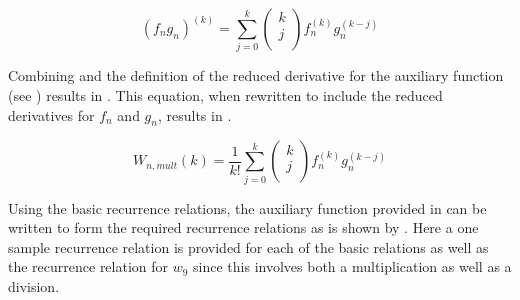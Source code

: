 \begin{equation} \label{eq:Leibniz}
\left(f_{n}g_{n}\right)^{\left( k\right)}=\displaystyle\sum_{j=0}^{k}
\left(
\begin{matrix}
k\\
j\\
\end{matrix}
\right)
f_{n}^{\left( k\right)}g_{n}^{\left( k-j\right)}
\end{equation}

Combining  and the definition of the reduced derivative for the auxiliary function (see ) results in . This equation, when rewritten to include the reduced derivatives for $f_{n}$ and $g_{n}$, results in .

\begin{equation} \label{eq:LeibnizInt}
W_{n,mult}\left(k\right)=\dfrac{1}{k!}\displaystyle\sum_{j=0}^{k}
\left(
\begin{matrix}
k\\
j\\
\end{matrix}
\right)
f_{n}^{\left( k\right)}g_{n}^{\left( k-j\right)}
\end{equation}

Using the basic recurrence relations, the auxiliary function provided in  can be written to form the required recurrence relations as is shown by . Here a one sample recurrence relation is provided for each of the basic relations as well as the recurrence relation for $w_{9}$ since this involves both a multiplication as well as a division.


